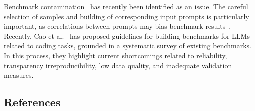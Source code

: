 Benchmark contamination~\cite{DBLP:journals/corr/abs-2410-16186} has recently been identified as an issue.
The careful selection of samples and building of corresponding input prompts is particularly important, as correlations between prompts may bias benchmark results~\cite{DBLP:conf/acl/SiskaMAB24}.
Recently, Cao et al.~\cite{cao2025should} has proposed guidelines for building benchmarks for LLMs related to coding tasks, grounded in a systematic survey of existing benchmarks. 
In this process, they highlight current shortcomings related to reliability, transparency irreproducibility, low data quality, and inadequate validation measures.


\subsection{References}





